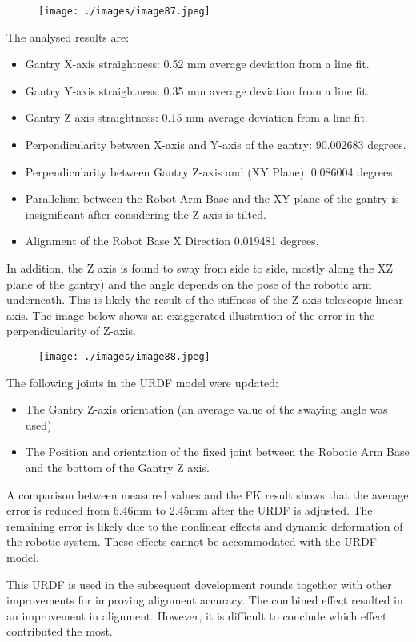 \begin{figure}[H]
\texttt{[image: ./images/image87.jpeg]}
\end{figure}


The analysed results are:

\begin{itemize}
	\item Gantry X-axis straightness: 0.52 mm average deviation from a line fit.

	\item Gantry Y-axis straightness: 0.35 mm average deviation from a line fit.

	\item Gantry Z-axis straightness: 0.15 mm average deviation from a line fit.

	\item Perpendicularity between X-axis and Y-axis of the gantry: 90.002683 degrees.

	\item Perpendicularity between Gantry Z-axis and (XY Plane): 0.086004 degrees.

	\item Parallelism between the Robot Arm Base and the XY plane of the gantry is insignificant after considering the Z axis is tilted.

	\item Alignment of the Robot Base X Direction 0.019481 degrees.

\end{itemize}
In addition, the Z axis is found to sway from side to side, mostly along the XZ plane of the gantry) and the angle depends on the pose of the robotic arm underneath. This is likely the result of the stiffness of the Z-axis telescopic linear axis. The image below shows an exaggerated illustration of the error in the perpendicularity of Z-axis.

\begin{figure}[H]
\texttt{[image: ./images/image88.jpeg]}
\end{figure}


The following joints in the URDF model were updated:

\begin{itemize}
	\item The Gantry Z-axis orientation (an average value of the swaying angle was used)

	\item The Position and orientation of the fixed joint between the Robotic Arm Base and the bottom of the Gantry Z axis.

\end{itemize}
A comparison between measured values and the FK result shows that the average error is reduced from 6.46mm to 2.45mm after the URDF is adjusted. The remaining error is likely due to the nonlinear effects and dynamic deformation of the robotic system. These effects cannot be accommodated with the URDF model.

This URDF is used in the subsequent development rounds together with other improvements for improving alignment accuracy. The combined effect resulted in an improvement in alignment. However, it is difficult to conclude which effect contributed the most. 


